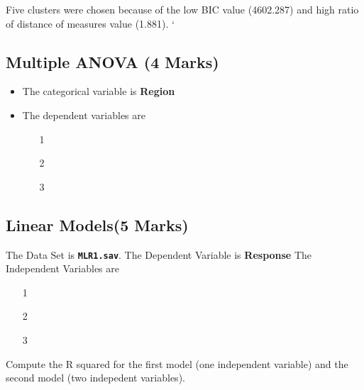Five clusters were chosen because of the low BIC value (4602.287) and high ratio of distance of measures value (1.881).
`	%


\subsection{Multiple ANOVA (4 Marks)}
\begin{itemize}
\item The categorical variable is \textbf{Region}
\item The dependent variables are
\begin{itemize}
\item[1]
\item[2]
\item[3]
\end{itemize}
\end{itemize}
\subsection{Linear Models(5 Marks) }
The Data Set is \textbf{\texttt{MLR1.sav}}.
The Dependent Variable is \textbf{Response}
The Independent Variables are
\begin{itemize}
\item[1]
\item[2]
\item[3]
\end{itemize}
Compute the R squared for the first model (one independent variable) and the second model (two indepedent variables).
